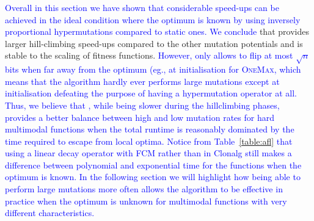 \documentclass[lettersize,journal]{IEEEtran}
\newcommand{\new}[1]{\textcolor{blue}{#1}}
\begin{document}






\new{Overall in this section we have shown that considerable speed-ups can be achieved in the ideal condition where the optimum is known by using inversely proportional hypermutations compared to static ones.
We conclude} that {\expoHD } provides larger hill-climbing speed-ups compared to the other mutation potentials and is stable to the scaling of fitness functions.
\new{However, {\expoHD } only allows to flip at most $\sqrt{n}$ bits when far away from the optimum (eg., at initialisation for \textsc{OneMax}, which means that the algorithm hardly ever performs large mutations except at initialisation defeating the purpose of having a hypermutation operator at all. Thus, we believe that \linHD, while being slower during the hillclimbing phases, provides a better balance between high and low mutation rates for hard multimodal functions when the total runtime is reasonably dominated by the time required to escape from local optima. Notice from Table~\ref{table:afl} that using a linear decay operator with FCM  rather than in Clonalg still makes a difference between polynomial and exponential time for the functions when the optimum is known. In the following section we will highlight how being able to perform large mutations more often allows the algorithm to be effective in practice when the optimum is unknown for multimodal functions with very different characteristics.}
\end{document}
